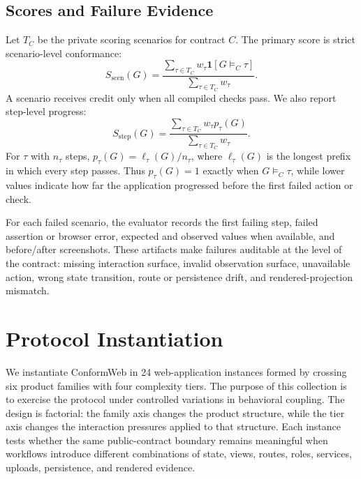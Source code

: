 \subsection{Scores and Failure Evidence}
\label{sec:scores}

Let \(T_C\) be the private scoring scenarios for contract \(C\). The primary
score is strict scenario-level conformance:
\begin{equation}
S_{\mathrm{scen}}(G)=
\frac{\sum_{\tau\in T_C} w_\tau \mathbf{1}[G\models_C\tau]}
     {\sum_{\tau\in T_C} w_\tau}.
\end{equation}
A scenario receives credit only when all compiled checks pass. We also report
step-level progress:
\begin{equation}
S_{\mathrm{step}}(G)=
\frac{\sum_{\tau\in T_C} w_\tau p_\tau(G)}
     {\sum_{\tau\in T_C} w_\tau}.
\end{equation}
For \(\tau\) with \(n_\tau\) steps, \(p_\tau(G)=\ell_\tau(G)/n_\tau\), where
\(\ell_\tau(G)\) is the longest prefix in which every step passes. Thus
\(p_\tau(G)=1\) exactly when \(G\models_C\tau\), while lower values indicate
how far the application progressed before the first failed action or check.

For each failed scenario, the evaluator records the first failing step, failed
assertion or browser error, expected and observed values when available, and
before/after screenshots. These artifacts make failures auditable at the level
of the contract: missing interaction surface, invalid observation surface,
unavailable action, wrong state transition, route or persistence drift, and
rendered-projection mismatch.

\section{Protocol Instantiation}
\label{sec:instantiation}

We instantiate ConformWeb in 24 web-application instances formed by crossing
six product families with four complexity tiers. The purpose of this collection
is to exercise the protocol under controlled variations in behavioral coupling.
The design is factorial: the family axis changes the product structure, while
the tier axis changes the interaction pressures applied to that structure. Each
instance tests whether the same public-contract boundary remains meaningful
when workflows introduce different combinations of state, views, routes, roles,
services, uploads, persistence, and rendered evidence.

